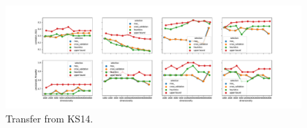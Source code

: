 \begin{figure}[t]
  \centering
    \includegraphics[width=\textwidth]{supplement/figures/KS14-transfer}
    \caption{Transfer from KS14.}
    \label{fig:ks14-transfer}
\end{figure}

